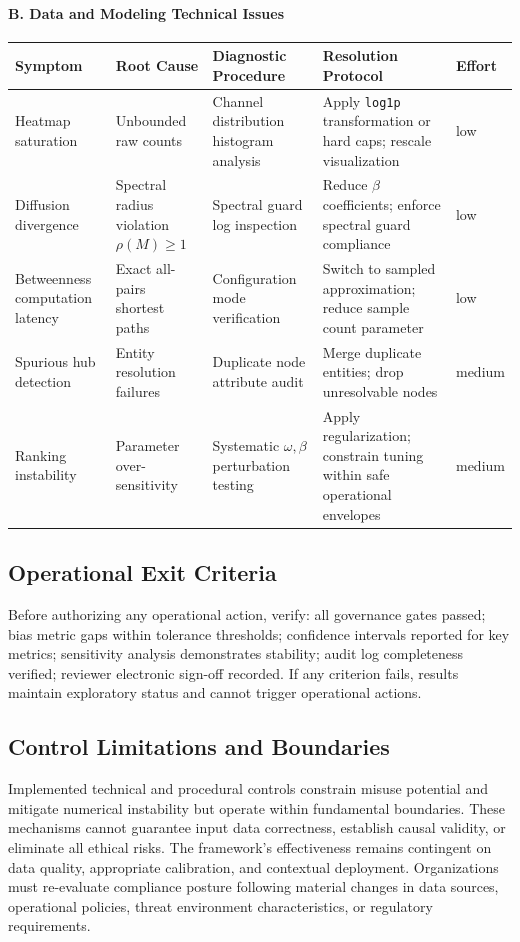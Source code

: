 \documentclass[12pt]{article}
\theoremstyle{plain}
\begin{document}
\paragraph{B. Data and Modeling Technical Issues}
\begin{center}
\small
\begin{tabular}{p{3.6cm} p{4.2cm} p{3.6cm} p{4.2cm} p{1.4cm}}
\toprule
\textbf{Symptom} & \textbf{Root Cause} & \textbf{Diagnostic Procedure} & \textbf{Resolution Protocol} & \textbf{Effort}\\
\midrule
Heatmap saturation & Unbounded raw counts & Channel distribution histogram analysis & Apply \texttt{log1p} transformation or hard caps; rescale visualization & low\\
Diffusion divergence & Spectral radius violation $\rho(M)\ge 1$ & Spectral guard log inspection & Reduce $\beta$ coefficients; enforce spectral guard compliance & low\\
Betweenness computation latency & Exact all-pairs shortest paths & Configuration mode verification & Switch to sampled approximation; reduce sample count parameter & low\\
Spurious hub detection & Entity resolution failures & Duplicate node attribute audit & Merge duplicate entities; drop unresolvable nodes & medium\\
Ranking instability & Parameter over-sensitivity & Systematic $\omega,\beta$ perturbation testing & Apply regularization; constrain tuning within safe operational envelopes & medium\\
\bottomrule
\end{tabular}
\end{center}

\subsection{Operational Exit Criteria}
Before authorizing any operational action, verify: all governance gates passed; bias metric gaps within tolerance thresholds; confidence intervals reported for key metrics; sensitivity analysis demonstrates stability; audit log completeness verified; reviewer electronic sign-off recorded. If any criterion fails, results maintain exploratory status and cannot trigger operational actions.

\subsection{Control Limitations and Boundaries}
\label{subsec:control-limitations}
Implemented technical and procedural controls constrain misuse potential and mitigate numerical instability but operate within fundamental boundaries. These mechanisms cannot guarantee input data correctness, establish causal validity, or eliminate all ethical risks. The framework's effectiveness remains contingent on data quality, appropriate calibration, and contextual deployment. Organizations must re-evaluate compliance posture following material changes in data sources, operational policies, threat environment characteristics, or regulatory requirements.
\end{document}
